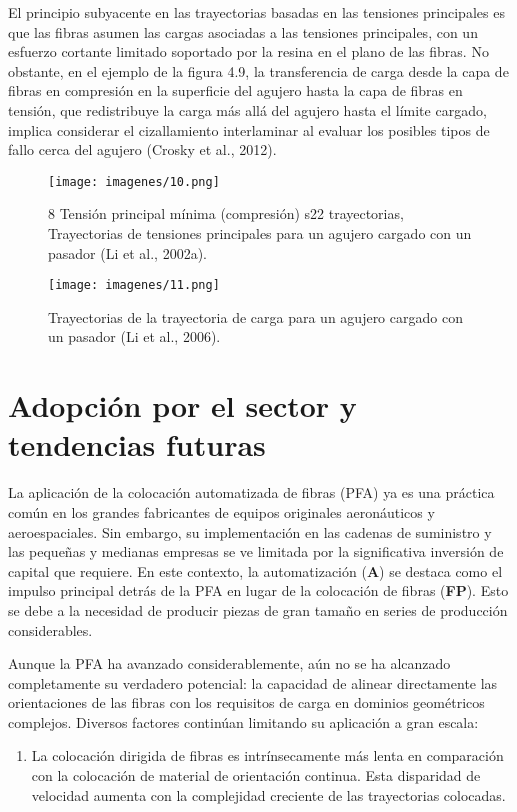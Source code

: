 \begin{enumerate}[label=\arabic*.]
El principio subyacente en las trayectorias basadas en las tensiones principales es que las fibras asumen las cargas asociadas a las tensiones principales, con un esfuerzo cortante limitado soportado por la resina en el plano de las fibras. No obstante, en el ejemplo de la figura 4.9, la transferencia de carga desde la capa de fibras en compresión en la superficie del agujero hasta la capa de fibras en tensión, que redistribuye la carga más allá del agujero hasta el límite cargado, implica considerar el cizallamiento interlaminar al evaluar los posibles tipos de fallo cerca del agujero (Crosky et al., 2012).
\begin{figure}[h]
    \centering
    \texttt{[image: imagenes/10.png]}
    \caption{8 Tensión principal mínima (compresión) s22 trayectorias, Trayectorias de tensiones principales para un agujero cargado con un pasador (Li et al., 2002a).}
    \label{fig:enter-label}
\end{figure}


\begin{figure}[h]
    \centering
    \texttt{[image: imagenes/11.png]}
    \caption{Trayectorias de la trayectoria de carga para un agujero cargado con un pasador (Li et al., 2006).}
    \label{fig:enter-label}
\end{figure}

\section{Adopción por el sector y tendencias futuras}
La aplicación de la colocación automatizada de fibras (PFA) ya es una práctica común en los grandes fabricantes de equipos originales aeronáuticos y aeroespaciales. Sin embargo, su implementación en las cadenas de suministro y las pequeñas y medianas empresas se ve limitada por la significativa inversión de capital que requiere. En este contexto, la automatización (\textbf{A}) se destaca como el impulso principal detrás de la PFA en lugar de la colocación de fibras (\textbf{FP}). Esto se debe a la necesidad de producir piezas de gran tamaño en series de producción considerables.

Aunque la PFA ha avanzado considerablemente, aún no se ha alcanzado completamente su verdadero potencial: la capacidad de alinear directamente las orientaciones de las fibras con los requisitos de carga en dominios geométricos complejos. Diversos factores continúan limitando su aplicación a gran escala:

\begin{enumerate}
    \item La colocación dirigida de fibras es intrínsecamente más lenta en comparación con la colocación de material de orientación continua. Esta disparidad de velocidad aumenta con la complejidad creciente de las trayectorias colocadas.
    

\end{enumerate}
\end{enumerate}

